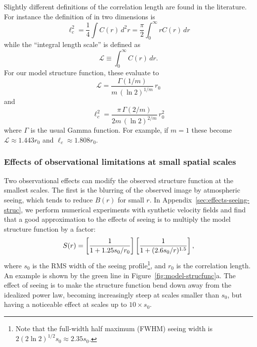 \documentclass[fleqn,usenatbib, useAMS, a4paper]{mnras}
\newcommand\startNEW{\color{black}}
\newcommand\stopNEW{\color{black}}
\begin{document}
\newcommand\LL{\ensuremath{\mathcal{L}}}
Slightly different definitions of the correlation length
are found in the literature.
For instance the definition of \citet{Jaupart:2022i}
in two dimensions is
\begin{equation}
  \label{eq:2}
  \ell_c^2 = \frac{1}{4} \int C(r) \, d^2 r
  = \frac{\pi}{2} \int_0^\infty r C(r) \, d r
\end{equation}
while the ``integral length scale'' \citep{Pope:2000p} is defined
as
\begin{equation}
  \label{eq:3}
  \LL \equiv \int_0^\infty C(r)\, dr .
\end{equation}
For our model structure function, these evaluate to
\begin{equation}
  \label{eq:4}
  \LL = \frac{\Gamma(1/m)}{m\, (\ln 2)^{1/m}} \, r_0
\end{equation}
and
\begin{equation}
  \label{eq:4}
   \ell_c^2 = \frac{\pi\,  \Gamma(2/m)}{2m\, (\ln 2)^{2/m}} \, r_0^2
\end{equation}
where \(\Gamma\) is the usual Gamma function.
For example, if \(m = 1\) these become \(\LL \approx 1.443 r_0\)
and \(\ell_c \approx 1.808 r_0\). 

\subsubsection{Effects of observational limitations at small spatial scales}
\label{sec:effect-observ-limit}

Two observational effects can modify the observed structure function at the smallest scales.
The first is the blurring of the observed image by atmospheric seeing,
which tends to reduce \(B(r)\) for small \(r\).
In Appendix~\ref{sec:effects-seeing-struc}, we perform numerical experiments
with synthetic velocity fields and find that
a good approximation to the effects of seeing is to multiply
the model structure function by a factor:
\begin{equation}\label{eq:ffs}
  \startNEW
  S(r) =
  \left[ \frac{1}{1 + 1.25 s_0 / r_0} \right]
  \left[ \frac{1}{1 + (2.6 s_0 / r)^{1.5}} \right]
  ,
  \stopNEW
\end{equation}
where \(s_0\) is the RMS width of the seeing profile\footnote{%
  Note that the full-width half maximum (FWHM) seeing width is
  \(2 (2 \ln 2)^{1/2} s_0 \approx 2.35 s_0\).
},
and \(r_0\) is the correlation length.
An example is shown by the green line in Figure~\ref{fig:model-strucfunc}a.
The effect of seeing is to make the structure function 
bend down away from the idealized power law, 
becoming increasingly steep at scales smaller than \(s_0\),
but having a noticeable effect at scales up to \(10 \times s_0\).
\end{document}
